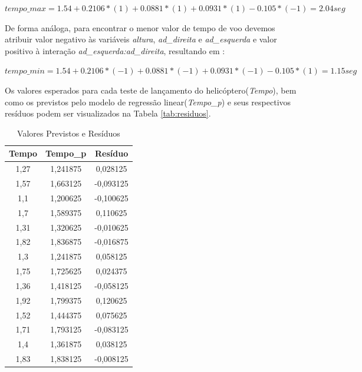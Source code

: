   $tempo\_max =  1.54 + 0.2106*(1) + 0.0881*(1) + 0.0931*(1) - 0.105*(-1) = 2.04seg$

De forma análoga, para encontrar o menor valor de tempo de voo devemos atribuir valor negativo às variáveis \textit{altura}, \textit{ad\_direita} e \textit{ad\_esquerda} e valor positivo à interação \textit{ad\_esquerda:ad\_direita}, resultando em :

  $tempo\_min =  1.54 + 0.2106*(-1) + 0.0881*(-1) + 0.0931*(-1) - 0.105*(1) = 1.15seg$

Os valores esperados para cada teste de lançamento do helicóptero(\textit{Tempo}), bem como os previstos pelo modelo de regressão linear(\textit{Tempo\_p}) e seus respectivos resíduos podem ser visualizados na Tabela \ref{tab:residuos}.

\begin{table}[H]
  \small
  \center
  \caption{Valores Previstos e Resíduos}
  \begin{tabular}{|c|c|c|}
  \hline
  \textbf{Tempo} & \textbf{Tempo\_p} & \textbf{Resíduo} \\ \hline
  1,27           & 1,241875          & 0,028125         \\ \hline
  1,57           & 1,663125          & -0,093125        \\ \hline
  1,1            & 1,200625          & -0,100625        \\ \hline
  1,7            & 1,589375          & 0,110625         \\ \hline
  1,31           & 1,320625          & -0,010625        \\ \hline
  1,82           & 1,836875          & -0,016875        \\ \hline
  1,3            & 1,241875          & 0,058125         \\ \hline
  1,75           & 1,725625          & 0,024375         \\ \hline
  1,36           & 1,418125          & -0,058125        \\ \hline
  1,92           & 1,799375          & 0,120625         \\ \hline
  1,52           & 1,444375          & 0,075625         \\ \hline
  1,71           & 1,793125          & -0,083125        \\ \hline
  1,4            & 1,361875          & 0,038125         \\ \hline
  1,83           & 1,838125          & -0,008125        \\ \hline

\end{tabular}
\end{table}
